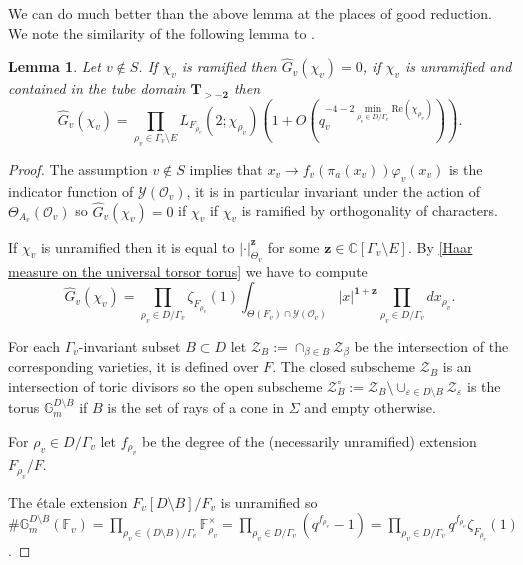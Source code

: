 \documentclass[a4paper,11pt,reqno]{amsart}
\newcommand{\C}{\mathbb{C}}
\newcommand{\F}{\mathbb{F}}
\newcommand{\G}{\mathbb{G}}
\renewcommand{\Re}{\mathrm{Re}}
\newtheorem{lemma}[theorem]{Lemma}
\theoremstyle{definition}
\begin{document}
We can do much better than the above lemma at the places of good reduction. We note the similarity of the following lemma to \cite[Lem.~3.2.2]{Chambert-Loir2010Integral}. 
\begin{lemma}
	Let $v \not \in S$. If $\chi_v$ is ramified then $\hat{G}_v(\chi_v) = 0$, if $\chi_v$ is unramified and contained in the tube domain $\mathbf{T}_{>- \mathbf{2}}$ then
	\begin{equation*}
		\hat{G}_v(\chi_v) = \prod_{\rho_v \in \Gamma_v \setminus E} L_{F_{\rho_v}}(2 ; \chi_{\rho_v})\left(1 + O\left(q_{v}^{- 4 - 2\min_{\rho_v \in D / \Gamma_v}\Re(\chi_{\rho_v})}\right)\right).
	\end{equation*}
	\label{Fourier transform at places of good reduction}
\end{lemma}
\begin{proof}	
	The assumption $v \not \in S$ implies that $x_v \to f_v(\pi_a(x_v)) \varphi_v(x_v)$ is the indicator function of $\mathcal{Y}(\mathcal{O}_v)$, it is in particular invariant under the action of $\Theta_{A_v}(\mathcal{O}_v)$ so $\hat{G}_v(\chi_v) = 0$ if $\chi_v$ if $\chi_v$ is ramified by orthogonality of characters.
	
	If $\chi_v$ is unramified then it is equal to $|\cdot|_{\Theta_v}^{\mathbf{z}}$ for some $\mathbf{z} \in \C[\Gamma_v \setminus E]$. By \eqref{Haar measure on the universal torsor torus} we have to compute
	\begin{equation*}
		\hat{G}_v(\chi_v) = \prod_{\rho_v \in D / \Gamma_v} \zeta_{F_{\rho_v}}(1) \int_{\Theta(F_v) \cap \mathcal{Y}(\mathcal{O}_v)} |x|^{\mathbf{1} + \mathbf{z}} \prod_{\rho_v \in D / \Gamma_v} d x_{\rho_v}.
	\end{equation*}
	
	For each $\Gamma_v$-invariant subset $B \subset D$ let $\mathcal{Z}_B := \cap_{\beta \in B} \mathcal{Z}_{\beta}$ be the intersection of the corresponding varieties, it is defined over $F$. The closed subscheme $\mathcal{Z}_B$ is an intersection of toric divisors so the open subscheme $\mathcal{Z}_B^{\circ} := \mathcal{Z}_B \setminus \cup_{\varepsilon \in D \setminus B} \mathcal{Z}_{\varepsilon}$ is the torus $\G_m^{D \setminus B}$ if $B$ is the set of rays of a cone in $\Sigma$ and empty otherwise. 
	
	For $\rho_v \in D / \Gamma_v$ let $f_{\rho_v}$ be the degree of the (necessarily unramified) extension $F_{\rho_v}/F$.
	
	The \'etale extension $F_v[D \setminus B]/F_v$ is unramified so $\# \G_m^{D \setminus B}(\F_v) = \prod_{\rho_v \in (D \setminus B) / \Gamma_v} \F_{\rho_v}^{\times} = \prod_{\rho_v \in D / \Gamma_v} (q^{f_{\rho_v}} - 1) = \prod_{\rho_v \in D / \Gamma_v} q^{f_{\rho_v}}\zeta_{F_{\rho_v}}(1)$.
	

\end{proof}
\end{document}

